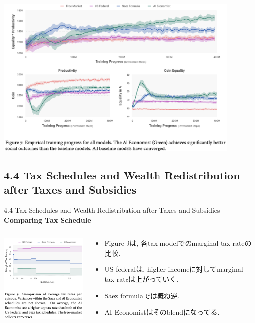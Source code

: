 \documentclass[unicode,aspectratio=169,11pt]{beamer}
\begin{document}
\begin{frame}{}{}
    \begin{center}
        \includegraphics[width=12cm]{figure7.png}
    \end{center}
\end{frame}

\subsection{4.4 Tax Schedules and Wealth Redistribution after Taxes and Subsidies}
\begin{frame}{4.4 Tax Schedules and Wealth Redistribution after Taxes and Subsidies}{}
    {\bf Comparing Tax Schedule}
    \begin{columns}
        \begin{column}{0.5\textwidth}
            \begin{center}
                \includegraphics[width=6cm]{figure9.png}
            \end{center}
        \end{column}
        \begin{column}{0.5\textwidth}
            \begin{itemize}
                \item Figure 9は, 各tax modelでのmarginal tax rateの比較.
                \item US federalは, higher incomeに対してmarginal tax rateは上がっていく.
                \item Saez formulaでは概ね逆.
                \item AI Economistはそのblendになってる.
            \end{itemize}
        \end{column}
    \end{columns}
\end{frame}
\end{document}
